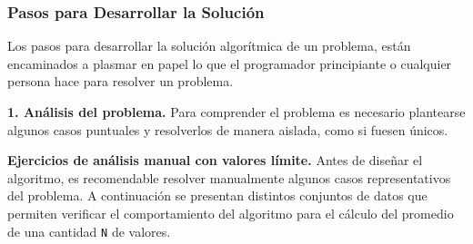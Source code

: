 \documentclass[12pt,twoside]{book}
\begin{document}
					\subsubsection{Pasos para Desarrollar la Solución}
						\noindent
						Los pasos para desarrollar la solución algorítmica de un problema, están encaminados a plasmar en papel lo que el programador principiante o cualquier persona hace para resolver un problema.
						
						\noindent
						\textbf{1. Análisis del problema.} Para comprender el problema es necesario plantearse algunos casos puntuales y resolverlos de manera aislada, como si fuesen únicos.
						
						\noindent
						\textbf{Ejercicios de análisis manual con valores límite.}
						Antes de diseñar el algoritmo, es recomendable resolver manualmente algunos casos representativos del problema. A continuación se presentan distintos conjuntos de datos que permiten verificar el comportamiento del algoritmo para el cálculo del promedio de una cantidad \texttt{N} de valores.
							
\end{document}
